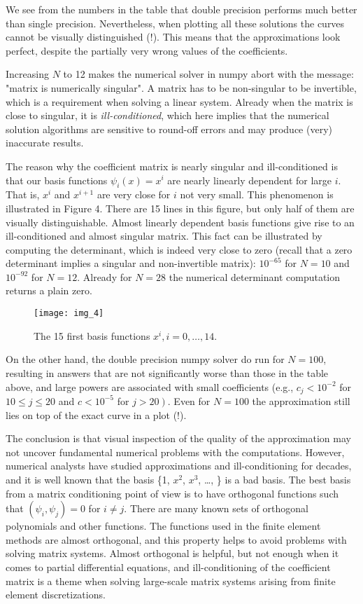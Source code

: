 \documentclass[../main.tex]{subfiles}
\begin{document}
\noindent We see from the numbers in the table that double precision performs much better than single precision. Nevertheless, when plotting all these solutions the curves cannot be visually distinguished (!). This means that the approximations look perfect, despite the partially very wrong values of the coefficients.

Increasing $N$ to 12 makes the numerical solver in numpy abort with the message: "matrix is numerically singular". A matrix has to be non-singular to be invertible, which is a requirement when solving a linear system. Already when the matrix is close to singular, it is \textit{ill-conditioned}, which here implies that the numerical solution algorithms are sensitive to round-off errors and may produce (very) inaccurate results.

The reason why the coefficient matrix is nearly singular and ill-conditioned is that our basis functions $\psi_{i}(x)=x^{i}$ are nearly linearly dependent for large $i$. That is, $x^{i}$ and $x^{i+1}$ are very close for $i$ not very small. This phenomenon is illustrated in Figure 4. There are 15 lines in this figure, but only half of them are visually distinguishable. Almost linearly dependent basis functions give rise to an ill-conditioned and almost singular matrix. This fact can be illustrated by computing the determinant, which is indeed very close to zero (recall that a zero determinant implies a singular and non-invertible matrix): $10^{-65}$ for $N=10$ and $10^{-92}$ for $N=12$. Already for $N=28$ the numerical determinant computation returns a plain zero.
\begin{figure}[H]
	\centering
	\texttt{[image: img\_4]}
	\caption{The 15 first basis functions $x^{i}, i=0, \ldots, 14$.}
	\label{fig:img_4}
\end{figure}
On the other hand, the double precision numpy solver do run for $N=100$, resulting in answers that are not significantly worse than those in the table above, and large powers are associated with small coefficients (e.g., $c_{j}<10^{-2}$ for $10 \leq j \leq 20$ and $c<10^{-5}$ for $\left.j>20\right)$. Even for $N=100$ the approximation still lies on top of the exact curve in a plot (!).

The conclusion is that visual inspection of the quality of the approximation may not uncover fundamental numerical problems with the computations. However, numerical analysts have studied approximations and ill-conditioning for decades, and it is well known that the basis \{1, $x^{2}$, $x^{3}$, \ldots, \} is a bad basis. The best basis from a matrix conditioning point of view is to have orthogonal functions such that $\left(\psi_{i}, \psi_{j}\right)=0$ for $i \neq j$. There are many known sets of orthogonal polynomials and other functions. The functions used in the finite element methods are almost orthogonal, and this property helps to avoid problems with solving matrix systems. Almost orthogonal is helpful, but not enough when it comes to partial differential equations, and ill-conditioning of the coefficient matrix is a theme when solving large-scale matrix systems arising from finite element discretizations.
\bigbreak
\end{document}
